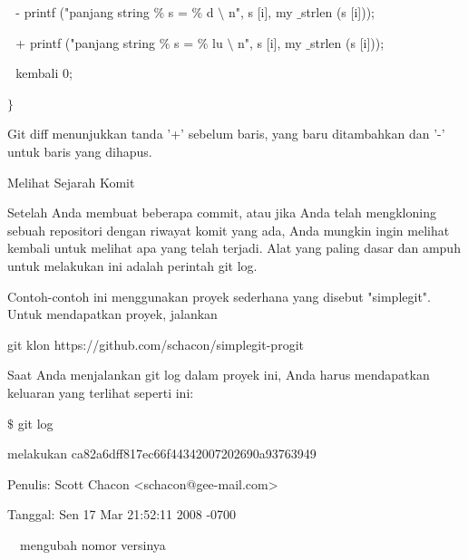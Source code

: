 \noindent 
 \hspace*{0.5in}  $  $ $  $ $  $- printf ("panjang string $  \%  $ s = $  \%  $ d  $  \setminus  $ n", s [i], my $  \_  $strlen (s [i])); \par
\noindent 
 \hspace*{0.5in}  $  $ $  $ $  $+ printf ("panjang string $  \%  $ s = $  \%  $ lu  $  \setminus  $ n", s [i], my $  \_  $strlen (s [i])); \par
\noindent 
 \hspace*{0.5in}  $  $ $  $ $  $kembali 0; \par
\noindent 
 \hspace*{0.5in}  $  \}  $ \par
 \vspace{\baselineskip}
\noindent 
Git diff menunjukkan tanda '+' sebelum baris, yang baru ditambahkan dan '-' untuk baris yang dihapus. \par
\noindent 
Melihat Sejarah Komit \par
\vspace{\baselineskip}
\noindent 
 \hspace*{0.5in} Setelah Anda membuat beberapa commit, atau jika Anda telah mengkloning sebuah repositori dengan riwayat komit yang ada, Anda mungkin ingin melihat kembali untuk melihat apa yang telah terjadi. Alat yang paling dasar dan ampuh untuk melakukan ini adalah perintah git log. \par
 \vspace{\baselineskip}
\noindent 
Contoh-contoh ini menggunakan proyek sederhana yang disebut "simplegit". Untuk mendapatkan proyek, jalankan \par
\noindent 
git klon https://github.com/schacon/simplegit-progit \par
\noindent 
Saat Anda menjalankan git log dalam proyek ini, Anda harus mendapatkan keluaran yang terlihat seperti ini: \par
\noindent 
 \hspace*{0.5in}  $  \$  $ git log \par
\noindent 
 \hspace*{0.5in} melakukan ca82a6dff817ec66f44342007202690a93763949 \par
\noindent 
 \hspace*{0.5in} Penulis: Scott Chacon <schacon@gee-mail.com> \par
\noindent 
 \hspace*{0.5in} Tanggal: Sen 17 Mar 21:52:11 2008 -0700 \par
\noindent 
 \hspace*{0.5in}  $  $ $  $ $  $ $  $mengubah nomor versinya \par
